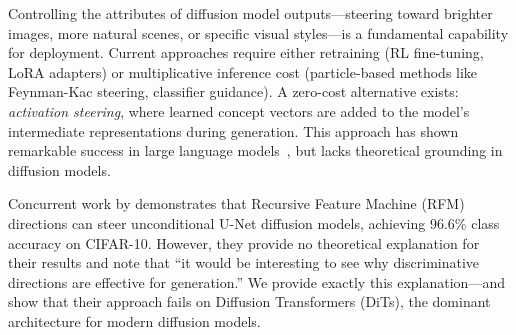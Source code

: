 \documentclass{article}
\theoremstyle{definition}
\begin{document}
Controlling the attributes of diffusion model outputs---steering toward brighter images, more natural scenes, or specific visual styles---is a fundamental capability for deployment.
Current approaches require either retraining (RL fine-tuning, LoRA adapters) or multiplicative inference cost (particle-based methods like Feynman-Kac steering, classifier guidance).
A zero-cost alternative exists: \emph{activation steering}, where learned concept vectors are added to the model's intermediate representations during generation.
This approach has shown remarkable success in large language models~\citep{turner2023activation,zou2023representation,marks2024geometry}, but lacks theoretical grounding in diffusion models.

Concurrent work by \citet{wang2026general} demonstrates that Recursive Feature Machine (RFM) directions can steer unconditional U-Net diffusion models, achieving 96.6\% class accuracy on CIFAR-10.
However, they provide no theoretical explanation for their results and note that ``it would be interesting to see why discriminative directions are effective for generation.''
We provide exactly this explanation---and show that their approach fails on Diffusion Transformers (DiTs), the dominant architecture for modern diffusion models.
\end{document}
